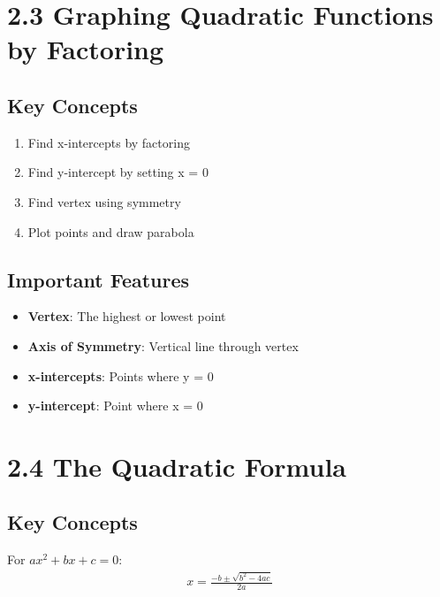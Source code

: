 \documentclass[12pt]{article}
\begin{document}
\section{2.3 Graphing Quadratic Functions by Factoring}
\subsection*{Key Concepts}
\begin{tcolorbox}[colback=lightgray,colframe=primary,title=Graphing Steps]
    \begin{enumerate}
        \item Find x-intercepts by factoring
        \item Find y-intercept by setting x = 0
        \item Find vertex using symmetry
        \item Plot points and draw parabola
    \end{enumerate}
\end{tcolorbox}

\subsection*{Important Features}
\begin{tcolorbox}[colback=lightgray,colframe=secondary,title=Graph Features]
    \begin{itemize}
        \item \textbf{Vertex}: The highest or lowest point
        \item \textbf{Axis of Symmetry}: Vertical line through vertex
        \item \textbf{x-intercepts}: Points where y = 0
        \item \textbf{y-intercept}: Point where x = 0
    \end{itemize}
\end{tcolorbox}

\section{2.4 The Quadratic Formula}
\subsection*{Key Concepts}
\begin{tcolorbox}[colback=lightgray,colframe=primary,title=Quadratic Formula]
    For $ax^2 + bx + c = 0$:
    \begin{align*}
        x = \frac{-b \pm \sqrt{b^2 - 4ac}}{2a}
    \end{align*}
\end{tcolorbox}
\end{document}
